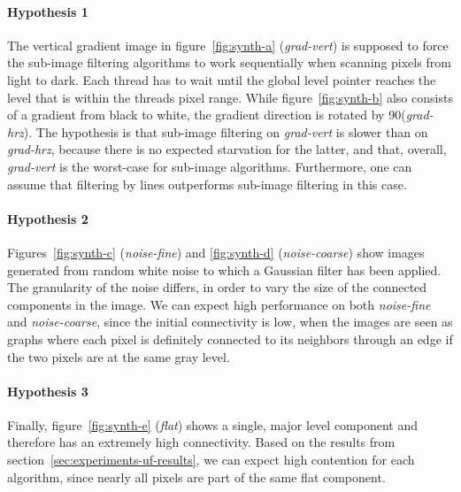 \paragraph{Hypothesis 1}

The vertical gradient image in figure~\ref{fig:synth-a} (\emph{grad-vert}) is
supposed to force the sub-image filtering algorithms to work sequentially when
scanning pixels from light to dark. Each thread has to wait until the global
level pointer reaches the level that is within the threads pixel range. While
figure~\ref{fig:synth-b} also consists of a gradient from black to white, the
gradient direction is rotated by 90\degree (\emph{grad-hrz}). The hypothesis is
that sub-image filtering on \emph{grad-vert} is slower than on \emph{grad-hrz},
because there is no expected starvation for the latter, and that, overall,
\emph{grad-vert} is the worst-case for sub-image algorithms. Furthermore, one
can assume that filtering by lines outperforms sub-image filtering in this case.

\paragraph{Hypothesis 2}

Figures~\ref{fig:synth-c} (\emph{noise-fine}) and \ref{fig:synth-d}
(\emph{noise-coarse}) show images generated from random white noise to which a
Gaussian filter has been applied. The granularity of the noise differs, in order
to vary the size of the connected components in the image. We can expect high
performance on both \emph{noise-fine} and \emph{noise-coarse}, since the initial
connectivity is low, when the images are seen as graphs where each pixel is
definitely connected to its neighbors through an edge if the two pixels are at
the same gray level.

\paragraph{Hypothesis 3}

Finally, figure~\ref{fig:synth-e} (\emph{flat}) shows a single, major level
component and therefore has an extremely high connectivity. Based on the results
from section~\ref{sec:experiments-uf-results}, we can expect high contention for
each algorithm, since nearly all pixels are part of the same flat component.

